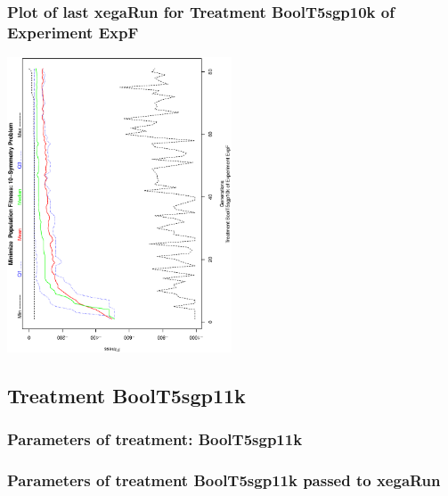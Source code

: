 \documentclass[18pt,c]{beamer}
\makeatletter
\def\beamer@writeslidentry@miniframesoff{%
  \expandafter\beamer@ifempty\expandafter{\beamer@framestartpage}{}%
  {%
   \clearpage\beamer@notesactions%
  }
}
\newcommand*{\miniframesoff}{\let\beamer@writeslidentry=\beamer@writeslidentry@miniframesoff}
\makeatother
\begin{document}
 \begin{frame}
 \frametitle{ Plot of last xegaRun for Treatment BoolT5sgp10k of Experiment ExpF }
 \begin{center}
\includegraphics[width=0.5\textwidth, angle=-90]
{ExpFPlotPopStatsFigure008.eps}
 \end{center}
 \label{report/ExpFPlotPopStatsFigure008.eps}  
 \end{frame}

\miniframesoff
\subsection{Treatment BoolT5sgp11k}

 \begin{frame}
 \fontsize{8pt}{9pt}\selectfont
 \frametitle{  Parameters of treatment: BoolT5sgp11k 
 }

 \label{ExpFtParmTable036.tex}  
 \end{frame}


 \begin{frame}
 \fontsize{8pt}{9pt}\selectfont
 \frametitle{  Parameters of treatment BoolT5sgp11k passed to xegaRun
 }

 \label{ExpFtParmTable037.tex}  
 \end{frame}
\end{document}
